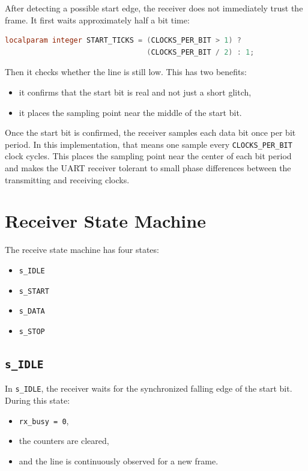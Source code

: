 \documentclass[12pt]{article}
\begin{document}
After detecting a possible start edge, the receiver does not immediately trust
the frame. It first waits approximately half a bit time:

\begin{lstlisting}[language=Verilog]
localparam integer START_TICKS = (CLOCKS_PER_BIT > 1) ?
                                 (CLOCKS_PER_BIT / 2) : 1;
\end{lstlisting}

Then it checks whether the line is still low. This has two benefits:

\begin{itemize}
    \item it confirms that the start bit is real and not just a short glitch,
    \item it places the sampling point near the middle of the start bit.
\end{itemize}

Once the start bit is confirmed, the receiver samples each data bit once per bit
period. In this implementation, that means one sample every
\texttt{CLOCKS\_PER\_BIT} clock cycles. This places the sampling point near the
center of each bit period and makes the UART receiver tolerant to small phase
differences between the transmitting and receiving clocks.

\section{Receiver State Machine}

The receive state machine has four states:

\begin{itemize}
    \item \texttt{s\_IDLE}
    \item \texttt{s\_START}
    \item \texttt{s\_DATA}
    \item \texttt{s\_STOP}
\end{itemize}

\subsection*{\texttt{s\_IDLE}}

In \texttt{s\_IDLE}, the receiver waits for the synchronized falling edge of the
start bit. During this state:

\begin{itemize}
    \item \texttt{rx\_busy = 0},
    \item the counters are cleared,
    \item and the line is continuously observed for a new frame.
\end{itemize}
\end{document}
